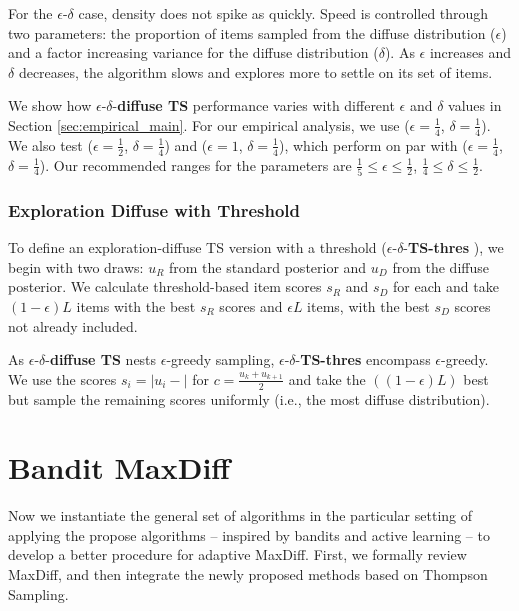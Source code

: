 \documentclass[nonblindrev]{informs3}
\newcommand{\edts}{$\epsilon$-$\delta$-\textbf{diffuse TS} }
\newcommand{\edtsthres}{$\epsilon$-$\delta$-\textbf{TS-thres} }
\newcommand{\numperset}{L}
\begin{document}
For the $\epsilon$-$\delta$ case, density does not spike as quickly. Speed is controlled through two parameters: the proportion of items sampled from the diffuse distribution ($\epsilon$) and a factor increasing variance for the diffuse distribution ($\delta$). As $\epsilon$ increases and $\delta$ decreases, the algorithm slows and explores more to settle on its set of items. 

We show how \edts performance varies with different $\epsilon$ and $\delta$ values in Section \ref{sec:empirical_main}.  For our empirical analysis, we use ($\epsilon=\frac{1}{4}$, $\delta=\frac{1}{4}$). We also test ($\epsilon=\frac{1}{2}$, $\delta=\frac{1}{4}$) and ($\epsilon=1$, $\delta=\frac{1}{4}$), which perform on par with ($\epsilon=\frac{1}{4}$, $\delta=\frac{1}{4}$). Our recommended ranges for the parameters are $\frac{1}{5}\leq \epsilon \leq \frac{1}{2}$, $\frac{1}{4}\leq \delta \leq \frac{1}{2}$.


\subsubsection{Exploration Diffuse with Threshold}

To define an exploration-diffuse TS version with a threshold (\edtsthres), we begin with two draws: $u_R$ from the standard posterior and $u_D$ from the diffuse posterior. We calculate threshold-based item scores $s_R$ and $s_D$ for each and take $(1- \epsilon) \numperset$ items with the best $s_R$ scores and $\epsilon \numperset$ items, with the best $s_D$ scores not already included. 

As \edts nests $\epsilon$-greedy sampling, \edtsthres encompass $\epsilon$-greedy. We use the scores $s_i=|u_i - |$ for $c=\frac{u_k+u_{k+1}}{2}$ and take the $((1-\epsilon)L)$ best but sample the remaining scores uniformly (i.e., the most diffuse distribution).


\section{Bandit MaxDiff}

Now we instantiate the general set of algorithms in the particular setting of applying the propose algorithms -- inspired by bandits and active learning -- to develop a better procedure for adaptive MaxDiff. First, we formally review MaxDiff, and then integrate the newly proposed methods based on Thompson Sampling.
\end{document}
